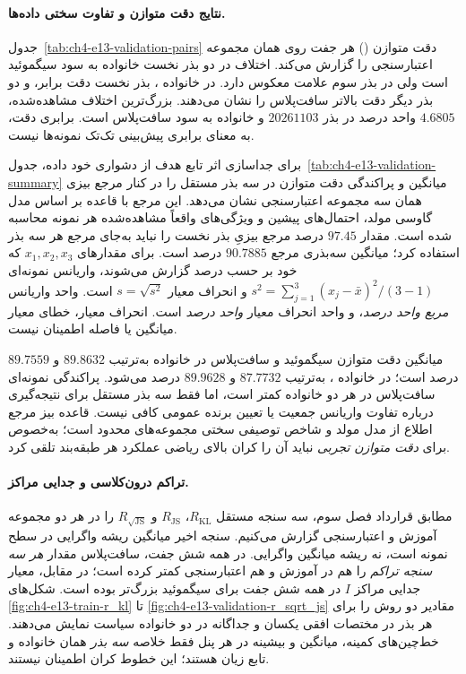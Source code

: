 \paragraph{نتایج دقت متوازن و تفاوت سختی داده‌ها.}
جدول~\ref{tab:ch4-e13-validation-pairs}
دقت متوازن () هر جفت روی همان مجموعه اعتبارسنجی
را گزارش می‌کند. اختلاف در دو بذر نخست خانواده
 به سود سیگموئید است ولی در بذر سوم
علامت معکوس دارد. در خانواده ، بذر نخست
دقت برابر، و دو بذر دیگر دقت بالاتر سافت‌پلاس را نشان می‌دهند.
بزرگ‌ترین اختلاف مشاهده‌شده، $4.6805$ واحد درصد
در بذر $20261103$ و خانواده  به سود
سافت‌پلاس است. برابری دقت، به معنای برابری پیش‌بینی
تک‌تک نمونه‌ها نیست.



برای جداسازی اثر تابع هدف از دشواری خود داده،
جدول~\ref{tab:ch4-e13-validation-summary}
میانگین و پراکندگی دقت متوازن در سه بذر مستقل را
در کنار مرجع بیزی همان سه مجموعه اعتبارسنجی نشان می‌دهد.
این مرجع با قاعده  بر اساس
مدل گاوسی مولد، احتمال‌های پیشین و ویژگی‌های واقعاً
مشاهده‌شده هر نمونه محاسبه شده است. مقدار $97.45$
درصد مرجع بیزیِ بذر نخست را نباید به‌جای مرجع هر سه
بذر استفاده کرد؛ میانگین سه‌بذری مرجع
$90.7885$ درصد است. برای مقدارهای
$x_1,x_2,x_3$ که خود بر حسب درصد گزارش می‌شوند،
واریانس نمونه‌ای $s^2=\sum_{j=1}^{3}(x_j-\bar x)^2/(3-1)$
و انحراف معیار $s=\sqrt{s^2}$ است.
واحد واریانس \emph{مربع واحد درصد}، و واحد انحراف
معیار \emph{واحد درصد} است. انحراف معیار،
خطای معیار میانگین یا فاصله اطمینان نیست.



میانگین دقت متوازن سیگموئید و سافت‌پلاس در خانواده
 به‌ترتیب $89.8632$ و $89.7559$
درصد است؛ در خانواده ، به‌ترتیب
$87.7732$ و $89.9628$ درصد می‌شود.
پراکندگی نمونه‌ای سافت‌پلاس در هر دو خانواده کمتر
است، اما فقط سه بذر مستقل برای نتیجه‌گیری درباره
تفاوت واریانس جمعیت یا تعیین برنده عمومی کافی نیست.
قاعده بیز  مرجع اطلاع از مدل مولد و شاخص
توصیفی سختی مجموعه‌های محدود است؛ به‌خصوص برای
\emph{دقت متوازن تجربی} نباید آن را کران بالای
ریاضی عملکرد هر طبقه‌بند تلقی کرد.



\paragraph{تراکم درون‌کلاسی و جدایی مراکز.}
مطابق قرارداد فصل سوم، سه سنجه مستقل
$R_{\mathrm{KL}}$،
$R_{\mathrm{JS}}$ و
$R_{\sqrt{\mathrm{JS}}}$
را در هر دو مجموعه آموزش و اعتبارسنجی گزارش می‌کنیم.
سنجه اخیر میانگین ریشه واگرایی در سطح نمونه است،
نه ریشه میانگین واگرایی.
در همه شش جفت، سافت‌پلاس مقدار
\emph{هر سه سنجه تراکم} را هم در آموزش و هم
اعتبارسنجی کمتر کرده است؛ در مقابل،
معیار جدایی مراکز $I$ در همه شش جفت برای
سیگموئید بزرگ‌تر بوده است. شکل‌های
\ref{fig:ch4-e13-train-r_kl} تا
\ref{fig:ch4-e13-validation-r_sqrt_js}
مقادیر دو روش را برای هر بذر در مختصات افقی
یکسان و جداگانه در دو خانواده سیاست نمایش می‌دهند.
خط‌چین‌های کمینه، میانگین و بیشینه در هر پنل
فقط خلاصه \emph{سه بذر} همان خانواده و تابع زیان
هستند؛ این خطوط کران اطمینان نیستند.

